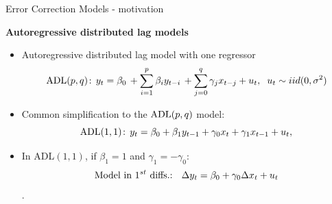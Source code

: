 \documentclass[usenames,dvipsnames]{beamer}
\begin{document}

\begin{frame}{Error Correction Models - motivation}

\textbf{Autoregressive distributed lag models}\\
\medskip
\begin{itemize}
\item Autoregressive distributed lag model with one regressor
$$\textnormal{ADL}(p,q)\!: \, y_t = \beta_0 \, + \sum_{i=1}^p \beta_i y_{t-i} \, + 
         \sum_{j=0}^q \gamma_j x_{t-j} + u_t, \hspace{0.2cm}
         u_t \sim iid(0,\sigma^2)$$

\item Common simplification to the $\textnormal{ADL}(p,q)$ model:
\begin{equation} \label{ADL11}
\textnormal{ADL}(1,1)\!: \, y_t = \beta_0 + \beta_1 y_{t-1} + 
         \gamma_0 x_t + \gamma_1 x_{t-1} + u_t,
\end{equation}
         
\item In ADL$(1,1)$, if $\beta_1 = 1$ and $\gamma_1 = -\gamma_0$:
$$\textnormal{Model in $1^{st}$ diffs.: } \,\,\, \Delta y_t = \beta_0 + \gamma_0 \Delta x_t + u_t $$.

\end{itemize}

\end{frame}
\end{document}

